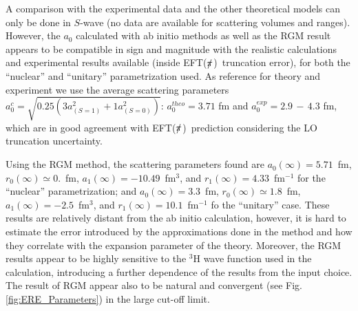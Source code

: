 \documentclass[5p,times]{elsarticle}
\newcommand{\eftnopi}{\mbox{EFT($\slashed{\pi}$) }}
\begin{document}
%
A comparison with the experimental data and the other theoretical models can only be done in $S$-wave (no data are available for scattering volumes and ranges). However, the $a_0$ calculated with ab initio methods as well as the RGM result appears to be compatible in sign and magnitude with the realistic calculations and experimental results available (inside \eftnopi truncation error), for both the ``nuclear'' and ``unitary'' parametrization used. 
As reference for theory and experiment we use the average scattering parameters $a_0^c=\sqrt{0.25(3a_{(S=1)}^2+1a_{(S=0)}^2)}$:   $a_0^{theo}=3.71$ fm\cite{Lazauskas:2019hil} and $a_0^{exp}=2.9\,-\,4.3$ fm\cite{Tilley:1992zz}, 
which are in good agreement with \eftnopi prediction considering the LO truncation uncertainty. 
%

%
Using the RGM method, the scattering parameters found are
$a_0(\infty) = 5.71$~fm, $r_0(\infty) \simeq 0.$~fm, $a_1(\infty) = -10.49$~fm$^3$, and $r_1(\infty) = 4.33$~fm$^{-1}$ for the ``nuclear'' parametrization; and
$a_0(\infty) = 3.3$~fm, $r_0(\infty) \simeq 1.8$~fm, $a_1(\infty) = -2.5$~fm$^3$, and $r_1(\infty) = 10.1$~fm$^{-1}$ fo the ``unitary'' case. 
These results are relatively distant from the ab initio calculation, however, it is hard to estimate the error introduced by the approximations done in the method and how they correlate with the expansion parameter of the theory.
Moreover, the RGM results appear to be highly sensitive to the $^3$H wave function used in the calculation, introducing a further dependence of the results from the input choice.
The result of RGM appear also to be natural and convergent (see Fig. \ref{fig:ERE_Parameters}) in the large cut-off limit.

%
\end{document}
